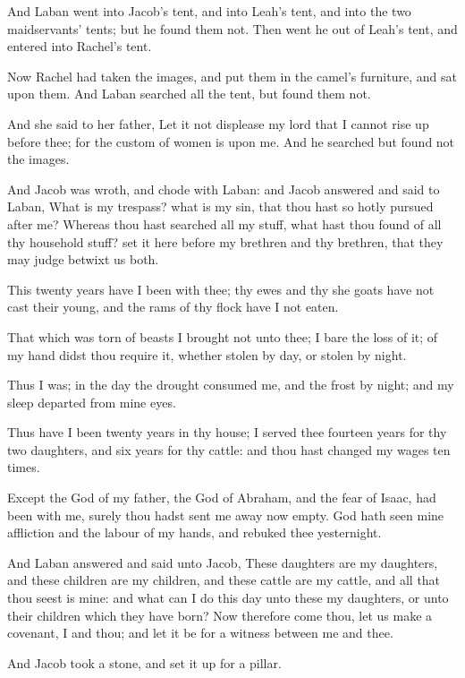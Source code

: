\verse And Laban went into Jacob's tent, and into Leah's tent, and into the two maidservants' tents; but he found them not. Then went he out of Leah's tent, and entered into Rachel's tent.

\verse Now Rachel had taken the images, and put them in the camel's furniture, and sat upon them. And Laban searched all the tent, but found them not.

\verse And she said to her father, Let it not displease my lord that I cannot rise up before thee; for the custom of women is upon me. And he searched but found not the images.

\verse And Jacob was wroth, and chode with Laban: and Jacob answered and said to Laban, What is my trespass? what is my sin, that thou hast so hotly pursued after me?  \verse Whereas thou hast searched all my stuff, what hast thou found of all thy household stuff? set it here before my brethren and thy brethren, that they may judge betwixt us both.

\verse This twenty years have I been with thee; thy ewes and thy she goats have not cast their young, and the rams of thy flock have I not eaten.

\verse That which was torn of beasts I brought not unto thee; I bare the loss of it; of my hand didst thou require it, whether stolen by day, or stolen by night.

\verse Thus I was; in the day the drought consumed me, and the frost by night; and my sleep departed from mine eyes.

\verse Thus have I been twenty years in thy house; I served thee fourteen years for thy two daughters, and six years for thy cattle: and thou hast changed my wages ten times.

\verse Except the God of my father, the God of Abraham, and the fear of Isaac, had been with me, surely thou hadst sent me away now empty. God hath seen mine affliction and the labour of my hands, and rebuked thee yesternight.

\verse And Laban answered and said unto Jacob, These daughters are my daughters, and these children are my children, and these cattle are my cattle, and all that thou seest is mine: and what can I do this day unto these my daughters, or unto their children which they have born?  \verse Now therefore come thou, let us make a covenant, I and thou; and let it be for a witness between me and thee.

\verse And Jacob took a stone, and set it up for a pillar.

